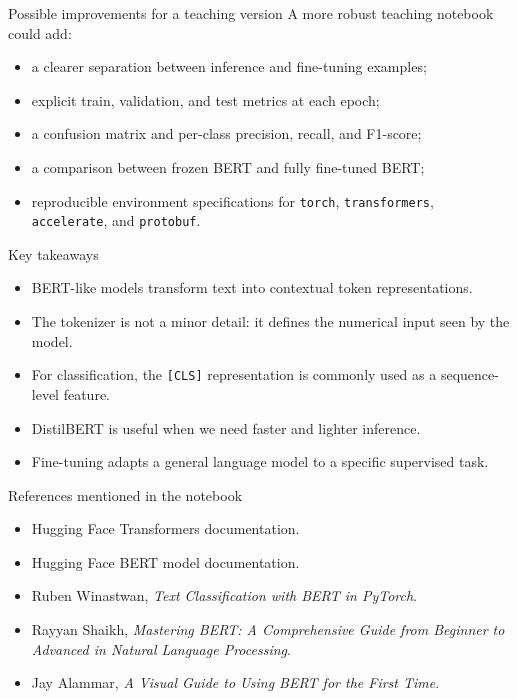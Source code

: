 \documentclass[aspectratio=169]{beamer}
\begin{document}
\begin{frame}{Possible improvements for a teaching version}
A more robust teaching notebook could add:
\begin{itemize}
    \item a clearer separation between inference and fine-tuning examples;
    \item explicit train, validation, and test metrics at each epoch;
    \item a confusion matrix and per-class precision, recall, and F1-score;
    \item a comparison between frozen BERT and fully fine-tuned BERT;
    \item reproducible environment specifications for \texttt{torch}, \texttt{transformers}, \texttt{accelerate}, and \texttt{protobuf}.
\end{itemize}
\end{frame}

\begin{frame}{Key takeaways}
\begin{itemize}
    \item BERT-like models transform text into contextual token representations.
    \item The tokenizer is not a minor detail: it defines the numerical input seen by the model.
    \item For classification, the \texttt{[CLS]} representation is commonly used as a sequence-level feature.
    \item DistilBERT is useful when we need faster and lighter inference.
    \item Fine-tuning adapts a general language model to a specific supervised task.
\end{itemize}
\end{frame}

\begin{frame}{References mentioned in the notebook}
\begin{itemize}
    \item Hugging Face Transformers documentation.
    \item Hugging Face BERT model documentation.
    \item Ruben Winastwan, \textit{Text Classification with BERT in PyTorch}.
    \item Rayyan Shaikh, \textit{Mastering BERT: A Comprehensive Guide from Beginner to Advanced in Natural Language Processing}.
    \item Jay Alammar, \textit{A Visual Guide to Using BERT for the First Time}.
\end{itemize}
\end{frame}

\end{document}
